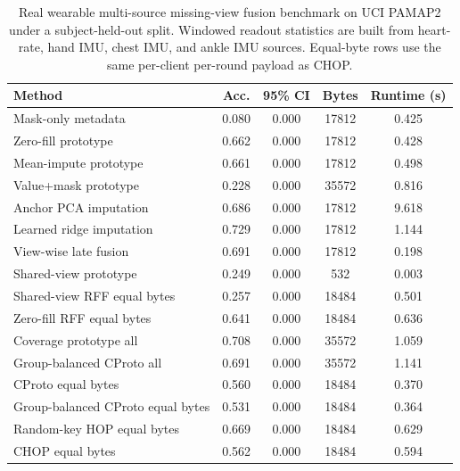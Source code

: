 \begin{table}[t]
\centering
\caption{Real wearable multi-source missing-view fusion benchmark on UCI PAMAP2 under a subject-held-out split. Windowed readout statistics are built from heart-rate, hand IMU, chest IMU, and ankle IMU sources. Equal-byte rows use the same per-client per-round payload as CHOP.}
\label{tab:if-pamap2-fusion}
\scriptsize
\setlength{\tabcolsep}{3pt}
\renewcommand{\arraystretch}{0.94}
\begin{tabular}{lcccc}
\toprule
Method & Acc. & 95\% CI & Bytes & Runtime (s) \\
\midrule
Mask-only metadata & 0.080 & 0.000 & 17812 & 0.425 \\
Zero-fill prototype & 0.662 & 0.000 & 17812 & 0.428 \\
Mean-impute prototype & 0.661 & 0.000 & 17812 & 0.498 \\
Value+mask prototype & 0.228 & 0.000 & 35572 & 0.816 \\
Anchor PCA imputation & 0.686 & 0.000 & 17812 & 9.618 \\
Learned ridge imputation & 0.729 & 0.000 & 17812 & 1.144 \\
View-wise late fusion & 0.691 & 0.000 & 17812 & 0.198 \\
Shared-view prototype & 0.249 & 0.000 & 532 & 0.003 \\
Shared-view RFF equal bytes & 0.257 & 0.000 & 18484 & 0.501 \\
Zero-fill RFF equal bytes & 0.641 & 0.000 & 18484 & 0.636 \\
Coverage prototype all & 0.708 & 0.000 & 35572 & 1.059 \\
Group-balanced CProto all & 0.691 & 0.000 & 35572 & 1.141 \\
CProto equal bytes & 0.560 & 0.000 & 18484 & 0.370 \\
Group-balanced CProto equal bytes & 0.531 & 0.000 & 18484 & 0.364 \\
Random-key HOP equal bytes & 0.669 & 0.000 & 18484 & 0.629 \\
CHOP equal bytes & 0.562 & 0.000 & 18484 & 0.594 \\
\bottomrule
\end{tabular}
\end{table}
